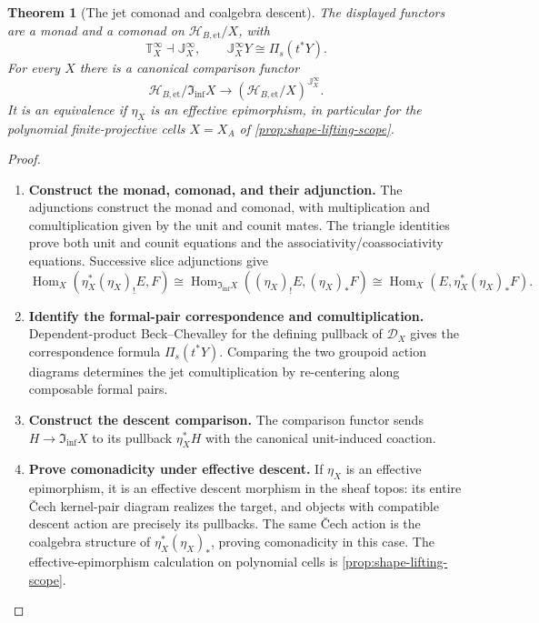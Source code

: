 \documentclass[11pt,a4paper]{article}
\numberwithin{algorithm}{section}
\numberwithin{equation}{section}
\newtheorem{theorem}{Theorem}[section]
\theoremstyle{definition}
\theoremstyle{remark}
\theoremstyle{plain}
\newcommand{\Hom}{\operatorname{Hom}}
\newcommand{\InfShape}{\mathfrak I_{\mathrm{inf}}}
\newcommand{\ThickEt}{\mathscr H_{B,\mathrm{et}}}
\theoremstyle{definition}
\theoremstyle{plain}
\begin{document}
\begin{theorem}[The jet comonad and coalgebra descent]
\label{thm:jets}
The displayed functors are a monad and a comonad on
$\ThickEt/X$, with
\[
 \mathbb T_X^\infty\dashv\mathbb J_X^\infty,
 \qquad \mathbb J_X^\infty Y\cong\Pi_s(t^*Y).
\]
For every $X$ there is a canonical comparison functor
\[
 \ThickEt/\InfShape X\longrightarrow
 (\ThickEt/X)^{\mathbb J_X^\infty}.
\]
It is an equivalence if $\eta_X$ is an effective epimorphism,
in particular for the polynomial finite-projective cells
$X=X_A$ of \cref{prop:shape-lifting-scope}.
\end{theorem}
\begin{proof}\leavevmode
\begin{enumerate}[leftmargin=*,align=left]
\item \textbf{Construct the monad, comonad, and their adjunction.}
The adjunctions construct the monad and comonad, with
multiplication and comultiplication given by the unit and
counit mates.  The triangle identities prove both unit and
counit equations and the associativity/coassociativity equations.
Successive slice adjunctions give
\[
 \Hom_X(\eta_X^*(\eta_X)_!E,F)
 \cong\Hom_{\InfShape X}((\eta_X)_!E,(\eta_X)_*F)
 \cong\Hom_X(E,\eta_X^*(\eta_X)_*F).
\]

\item \textbf{Identify the formal-pair correspondence and comultiplication.}
Dependent-product Beck--Chevalley for the defining pullback
of $\mathcal D_X$ gives the correspondence formula
$\Pi_s(t^*Y)$.  Comparing the two groupoid action diagrams
determines the jet comultiplication by re-centering along
composable formal pairs.

\item \textbf{Construct the descent comparison.}
The comparison functor sends $H\to\InfShape X$ to its
pullback $\eta_X^*H$ with the canonical unit-induced
coaction.

\item \textbf{Prove comonadicity under effective descent.}
If $\eta_X$ is an effective epimorphism, it is
an effective descent morphism in the sheaf topos: its entire
\v{C}ech kernel-pair diagram realizes the target, and
objects with compatible descent action are precisely its
pullbacks.  The same \v{C}ech action is the coalgebra
structure of $\eta_X^*(\eta_X)_*$, proving comonadicity
in this case.  The effective-epimorphism calculation on
polynomial cells is \cref{prop:shape-lifting-scope}.
\end{enumerate}
\end{proof}
\end{document}
